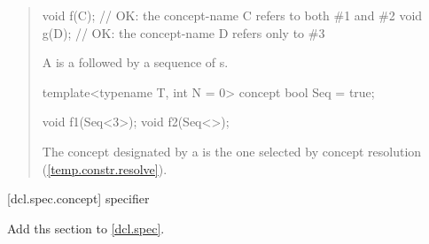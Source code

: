 \begin{quote}
\begin{codeblock}
void f(C); // OK: the concept-name C refers to both \#1 and \#2
void g(D); // OK: the concept-name D refers only to \#3
\end{codeblock}
\exitexample

\pnum
A  is a  followed 
by a sequence of s.
%
\enterexample
\begin{codeblock}
template<typename T, int N = 0> concept bool Seq = true;

void f1(Seq<3>);
void f2(Seq<>);
\end{codeblock}
\exitexample

\pnum
The concept designated by a 
is the one selected by concept resolution (\ref{temp.constr.resolve}).

\end{quote}

[dcl.spec.concept]{ specifier}

Add ths section to \ref{dcl.spec}.


